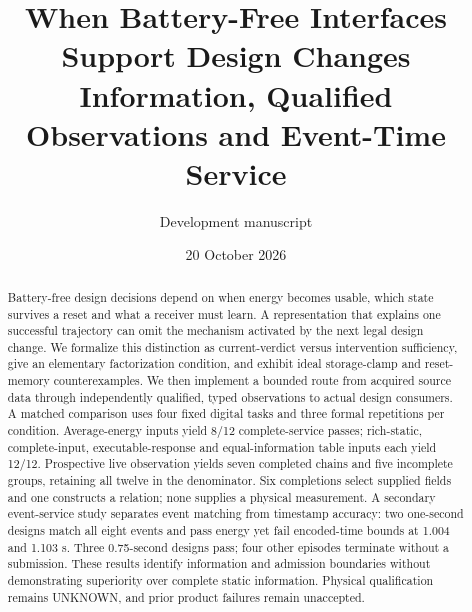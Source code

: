 \documentclass[10pt]{article}
\title{When Battery-Free Interfaces Support Design Changes\\Information, Qualified Observations and Event-Time Service}
\author{Development manuscript}
\date{20 October 2026}
\begin{document}
\maketitle
\begin{abstract}
Battery-free design decisions depend on when energy becomes usable, which state
survives a reset and what a receiver must learn. A representation that explains
one successful trajectory can omit the mechanism activated by the next legal
design change. We formalize this distinction as current-verdict versus
intervention sufficiency, give an elementary factorization condition, and
exhibit ideal storage-clamp and reset-memory counterexamples. We then implement
a bounded route from acquired source data through independently qualified,
typed observations to actual design consumers. A matched comparison uses four
fixed digital tasks and three formal repetitions per condition. Average-energy
inputs yield 8/12 complete-service passes; rich-static, complete-input,
executable-response and equal-information table inputs each yield 12/12.
Prospective live observation yields seven completed chains and five incomplete
groups, retaining all twelve in the denominator. Six completions select supplied
fields and one constructs a relation; none supplies a physical measurement.
A secondary event-service study separates event matching from timestamp
accuracy: two one-second designs match all eight events and pass energy yet
fail encoded-time bounds at 1.004 and 1.103 s. Three 0.75-second designs pass;
four other episodes terminate without a submission. These results identify
information and admission boundaries without demonstrating superiority over
complete static information. Physical qualification remains UNKNOWN, and prior
product failures remain unaccepted.
\end{abstract}









\FloatBarrier
\end{document}
